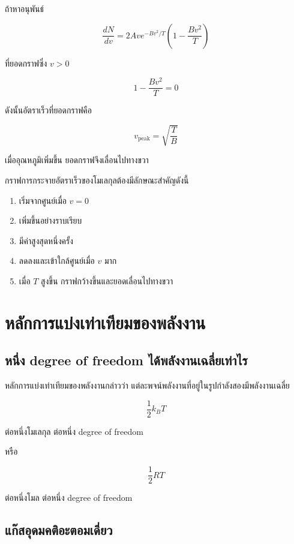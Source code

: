 ถ้าหาอนุพันธ์

\[
\frac{dN}{dv}
=
2Ave^{-Bv^2/T}
\left(1-\frac{Bv^2}{T}\right)
\]

ที่ยอดกราฟซึ่ง $v>0$

\[
1-\frac{Bv^2}{T}=0
\]

ดังนั้นอัตราเร็วที่ยอดกราฟคือ

\[
\boxed{
v_{\text{peak}}
=
\sqrt{\frac{T}{B}}
}
\]

เมื่ออุณหภูมิเพิ่มขึ้น ยอดกราฟจึงเลื่อนไปทางขวา

\begin{tcolorbox}[title=ลักษณะกราฟที่ต้องจำ]
กราฟการกระจายอัตราเร็วของโมเลกุลต้องมีลักษณะสำคัญดังนี้

\begin{enumerate}
    \item เริ่มจากศูนย์เมื่อ $v=0$
    \item เพิ่มขึ้นอย่างราบเรียบ
    \item มีค่าสูงสุดหนึ่งครั้ง
    \item ลดลงและเข้าใกล้ศูนย์เมื่อ $v$ มาก
    \item เมื่อ $T$ สูงขึ้น กราฟกว้างขึ้นและยอดเลื่อนไปทางขวา
\end{enumerate}
\end{tcolorbox}

\section{หลักการแบ่งเท่าเทียมของพลังงาน}

\subsection{หนึ่ง degree of freedom ได้พลังงานเฉลี่ยเท่าไร}

หลักการแบ่งเท่าเทียมของพลังงานกล่าวว่า แต่ละพจน์พลังงานที่อยู่ในรูปกำลังสองมีพลังงานเฉลี่ย

\[
\boxed{
\frac{1}{2}k_BT
}
\]

ต่อหนึ่งโมเลกุล ต่อหนึ่ง degree of freedom

หรือ

\[
\boxed{
\frac{1}{2}RT
}
\]

ต่อหนึ่งโมล ต่อหนึ่ง degree of freedom

\subsection{แก๊สอุดมคติอะตอมเดี่ยว}

